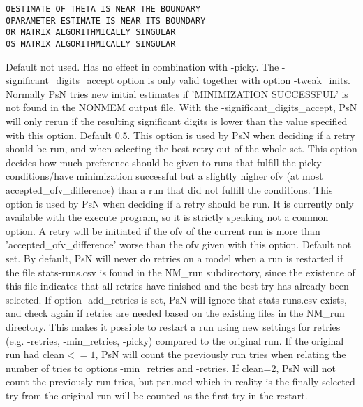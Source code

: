 \begin{optionlist}
\begin{verbatim}
0ESTIMATE OF THETA IS NEAR THE BOUNDARY
0PARAMETER ESTIMATE IS NEAR ITS BOUNDARY
0R MATRIX ALGORITHMICALLY SINGULAR
0S MATRIX ALGORITHMICALLY SINGULAR
\end{verbatim}
\nextopt
{}
Default not used. Has no effect in combination with -picky. The -significant\_digits\_accept option is only valid together with option -tweak\_inits. Normally PsN tries new initial estimates if 'MINIMIZATION SUCCESSFUL' is not found in the NONMEM output file. With the -significant\_digits\_accept, PsN will only rerun if the resulting significant digits is lower than the value specified with this option. 
\nextopt
{}
Default 0.5. This option is used by PsN when deciding if a retry should be run, and when selecting the best retry out of the whole set. 
This option decides how much preference should be given to runs that fulfill the picky conditions/have minimization successful 
but a slightly higher ofv (at most accepted\_ofv\_difference) than a run that did not fulfill the conditions.  
\nextopt
{}
This option is used by PsN when deciding if a retry should be run. It is currently only available with the execute program,
so it is strictly speaking not a common option.
A retry will be initiated if the ofv of the current run is more than 'accepted\_ofv\_difference' worse than the ofv
given with this option.
\nextopt
{}
Default not set. By default, PsN will never do retries on a model when a run is restarted if the file stats-runs.csv is found in the NM\_run subdirectory, since the existence of this file indicates that all retries have finished and the best try has already been selected. If option -add\_retries is set, PsN will ignore that stats-runs.csv exists, and check again if retries are needed based on the existing files in the NM\_run directory. This makes it possible to restart a run using new settings for retries (e.g. -retries, -min\_retries, -picky) compared to the original run. If the original run had clean$<=1$, PsN will count the previously run tries when relating the number of tries to options -min\_retries and -retries. If clean=2, PsN will not count the previously run tries, but psn.mod which in reality is the finally selected try from the original run will be counted as the first try in the restart.  
\nextopt
\end{optionlist}
